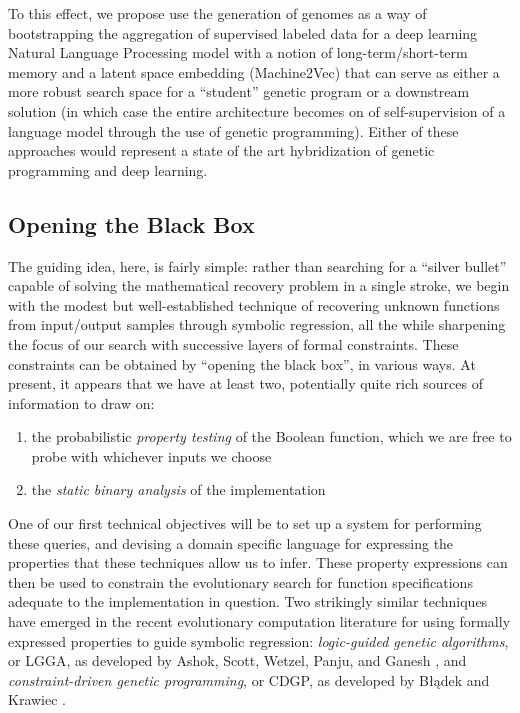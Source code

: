 \documentclass[11pt]{article}
\begin{document}
To this effect, we propose use the generation of genomes as a way of bootstrapping the aggregation of supervised labeled data for a deep learning Natural Language Processing model with a notion of long-term/short-term memory and a latent space embedding (Machine2Vec) that can serve as either a more robust search space for a “student” genetic program or a downstream solution (in which case the entire architecture becomes on of self-supervision of a language model through the use of genetic programming). Either of these approaches would represent a state of the art hybridization of genetic programming and deep learning.

\subsection{Opening the Black Box}
\label{sec:org503f08b}
The guiding idea, here, is fairly simple: rather than searching for a ``silver bullet'' capable of solving the mathematical recovery problem in a single stroke, we begin with the modest but well-established technique of recovering unknown functions from input/output samples through symbolic regression, all the while sharpening the focus of our search with successive layers of formal constraints. These constraints can be obtained by ``opening the black box'', in various ways. At present, it appears that we have at least two, potentially quite rich sources of information to draw on:

\begin{enumerate}
\item the probabilistic \emph{property testing} of the Boolean function, which we are free to probe with whichever inputs we choose
\item the \emph{static binary analysis} of the implementation
\end{enumerate}

One of our first technical objectives will be to set up a system for performing these queries, and devising a domain specific language for expressing the properties that these techniques allow us to infer. These property expressions can then be used to constrain the evolutionary search for function specifications adequate to the implementation in question. Two strikingly similar techniques have emerged in the recent evolutionary computation literature for using formally expressed properties to guide symbolic regression: \emph{logic-guided genetic algorithms}, or LGGA, as developed by Ashok, Scott, Wetzel, Panju, and Ganesh \cite{ashok2020logic}, and \emph{constraint-driven genetic programming}, or CDGP, as developed by Błądek and Krawiec \cite{bladek2019symbolic}.
\end{document}
